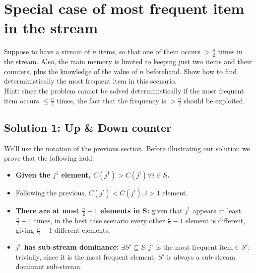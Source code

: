 \section{Special case of most frequent item in the stream}

Suppose to have a stream of $n$ items, so that one of them occurs $> \frac{n}{2}$
times in the stream.
Also, the main memory is limited to keeping just two items and their counters, plus
the knowledge of the value of $n$ beforehand.
Show how to find deterministically the most frequent item in this scenario.
\\ Hint: since the problem cannot be solved deterministically if the most
frequent item occurs $\leq \frac{n}{2}$ times, the fact that the frequency is
$> \frac{n}{2}$ should be exploited.

\subsection{Solution 1: Up \& Down counter}
We'll use the notation of the previous section.
Before illustrating our solution we prove that the following hold:
    \begin{itemize}
    \label{frequence_dominance}\item \textbf{Given the $j^{1}$ element, $C(j^{1}) > C(j^{i}) \forall i \in S$.}
    \item Following the previous, $C(j^{i}) < C(j^{i}),  i > 1$ element.
    \item \textbf{There are at most $\frac{n}{2} - 1$ elements in S:} given that $j^{1}$
    appears at least $\frac{n}{2} + 1$ times, in the best case scenario every
    other $\frac{n}{2} - 1$ element is different, giving $\frac{n}{2} - 1$
    different elements.
    \label{sub-stream_dominance}~\item \textbf{$j^{1}$ has sub-stream dominance:}
    $\exists S' \subseteq S: j^{1} \textrm{ is the most frequent item} \in S'$:
    trivially, since it is the most frequent element, $S'$ is always a sub-stream
    dominant sub-stream.
    \end{itemize}

